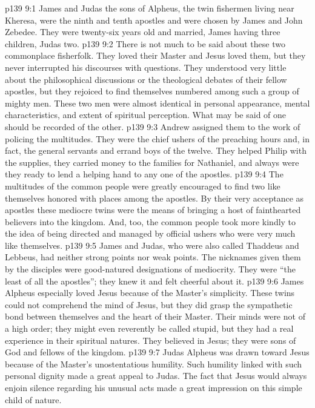 \vs p139 9:1 James and Judas the sons of Alpheus, the twin fishermen living near Kheresa, were the ninth and tenth apostles and were chosen by James and John Zebedee. They were twenty\hyp{}six years old and married, James having three children, Judas two.
\pc \vs p139 9:2 There is not much to be said about these two commonplace fisherfolk. They loved their Master and Jesus loved them, but they never interrupted his discourses with questions. They understood very little about the philosophical discussions or the theological debates of their fellow apostles, but they rejoiced to find themselves numbered among such a group of mighty men. These two men were almost identical in personal appearance, mental characteristics, and extent of spiritual perception. What may be said of one should be recorded of the other.
\vs p139 9:3 Andrew assigned them to the work of policing the multitudes. They were the chief ushers of the preaching hours and, in fact, the general servants and errand boys of the twelve. They helped Philip with the supplies, they carried money to the families for Nathaniel, and always were they ready to lend a helping hand to any one of the apostles.
\vs p139 9:4 The multitudes of the common people were greatly encouraged to find two like themselves honored with places among the apostles. By their very acceptance as apostles these mediocre twins were the means of bringing a host of fainthearted believers into the kingdom. And, too, the common people took more kindly to the idea of being directed and managed by official ushers who were very much like themselves.
\vs p139 9:5 James and Judas, who were also called Thaddeus and Lebbeus, had neither strong points nor weak points. The nicknames given them by the disciples were good\hyp{}natured designations of mediocrity. They were “the least of all the apostles”; they knew it and felt cheerful about it.
\pc \vs p139 9:6 James Alpheus especially loved Jesus because of the Master’s simplicity. These twins could not comprehend the mind of Jesus, but they did grasp the sympathetic bond between themselves and the heart of their Master. Their minds were not of a high order; they might even reverently be called stupid, but they had a real experience in their spiritual natures. They believed in Jesus; they were sons of God and fellows of the kingdom.
\vs p139 9:7 Judas Alpheus was drawn toward Jesus because of the Master’s unostentatious humility. Such humility linked with such personal dignity made a great appeal to Judas. The fact that Jesus would always enjoin silence regarding his unusual acts made a great impression on this simple child of nature.
